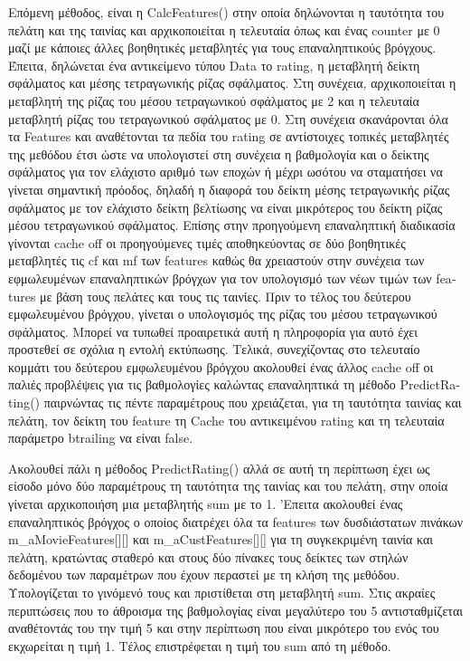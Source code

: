 \documentclass{report}
\begin{document}
Επόμενη μέθοδος, είναι η \textlatin{CalcFeatures}() στην οποία δηλώνονται η ταυτότητα του πελάτη και της ταινίας και αρχικοποιείται η τελευταία όπως και ένας \textlatin{counter} με 0 μαζί με κάποιες άλλες βοηθητικές μεταβλητές για τους επαναληπτικούς βρόγχους. Έπειτα, δηλώνεται ένα αντικείμενο τύπου \textlatin{Data} το \textlatin{rating}, η μεταβλητή δείκτη σφάλματος και μέσης τετραγωνικής ρίζας σφάλματος. Στη συνέχεια, αρχικοποιείται η μεταβλητή της ρίζας του μέσου τετραγωνικού σφάλματος με 2 και η τελευταία μεταβλητή ρίζας του τετραγωνικού σφάλματος με 0. Στη συνέχεια σκανάρονται όλα τα \textlatin{Features} και αναθέτονται τα πεδία του \textlatin{rating} σε αντίστοιχες τοπικές μεταβλητές της μεθόδου έτσι ώστε να υπολογιστεί στη συνέχεια η βαθμολογία και ο δείκτης σφάλματος για τον ελάχιστο αριθμό των εποχών ή μέχρι ωσότου να σταματήσει να γίνεται σημαντική πρόοδος, δηλαδή η διαφορά του δείκτη μέσης τετραγωνικής ρίζας σφάλματος με τον ελάχιστο δείκτη βελτίωσης να είναι μικρότερος του δείκτη ρίζας μέσου τετραγωνικού σφάλματος. Επίσης στην προηγούμενη επαναληπτική διαδικασία γίνονται \textlatin{cache off} οι προηγούμενες τιμές αποθηκεύοντας σε δύο βοηθητικές μεταβλητές τις \textlatin{cf} και \textlatin{mf}  των \textlatin{features} καθώς θα χρειαστούν στην συνέχεια των εφμωλευμένων επαναληπτικών βρόγχων για τον υπολογισμό των νέων τιμών των \textlatin{features} με βάση τους πελάτες και τους τις ταινίες. Πριν το τέλος του δεύτερου εμφωλευμένου βρόγχου, γίνεται ο υπολογισμός της ρίζας του μέσου τετραγωνικού σφάλματος. Μπορεί να τυπωθεί προαιρετικά αυτή η πληροφορία για αυτό έχει προστεθεί σε σχόλια η εντολή εκτύπωσης. Τελικά, συνεχίζοντας στο τελευταίο κομμάτι του δεύτερου εμφωλευμένου βρόγχου ακολουθεί ένας άλλος \textlatin{cache off} οι παλιές προβλέψεις για τις βαθμολογίες καλώντας επαναληπτικά τη μέθοδο \textlatin{PredictRating}() παιρνώντας τις πέντε παραμέτρους που χρειάζεται, για τη ταυτότητα ταινίας και πελάτη, τον δείκτη του \textlatin{feature} τη \textlatin{Cache} του αντικειμένου \textlatin{rating} και τη τελευταία παράμετρο \textlatin{btrailing} να είναι \textlatin{false}. 

Ακολουθεί πάλι η μέθοδος \textlatin{PredictRating}() αλλά σε αυτή τη περίπτωση έχει ως είσοδο μόνο δύο παραμέτρους τη ταυτότητα της ταινίας και του πελάτη, στην οποία γίνεται αρχικοποιήση μια μεταβλητής \textlatin{sum} με το 1. 'Επειτα ακολουθεί ένας επαναληπτικός βρόγχος ο οποίος διατρέχει όλα τα \textlatin{features} των δυσδιάστατων πινάκων \textlatin{m\_aMovieFeatures}[][] και \textlatin{m\_aCustFeatures}[][] για τη συγκεκριμένη ταινία και πελάτη, κρατώντας σταθερό και στους δύο πίνακες τους δείκτες των στηλών δεδομένου των παραμέτρων που έχουν περαστεί με τη κλήση της μεθόδου.
Υπολογίζεται το γινόμενό τους και πριστίθεται στη μεταβλητή  \textlatin{sum}. Στις ακραίες περιπτώσεις που το άθροισμα της βαθμολογίας είναι μεγαλύτερο του 5 αντισταθμίζεται αναθέτοντάς του την τιμή 5 και στην περίπτωση που είναι μικρότερο του ενός του εκχωρείται η τιμή 1. Τέλος επιστρέφεται η τιμή του \textlatin{sum} από τη μέθοδο.      
\end{document}
